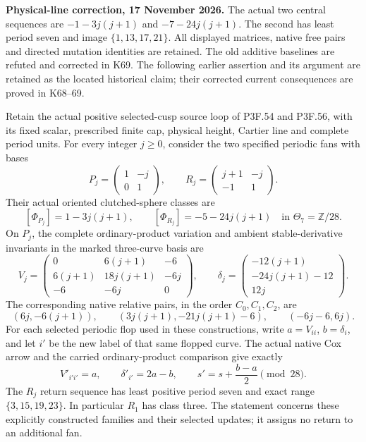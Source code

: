 \begin{theorem}\label{night:P3K.59}
\par\noindent\textbf{Physical-line correction, 17 November 2026.} The actual two central sequences are \(-1-3j(j+1)\) and \(-7-24j(j+1)\). The second has least period seven and image \(\{1,13,17,21\}\). All displayed matrices, native free pairs and directed mutation identities are retained. The old additive baselines are refuted and corrected in K69. The following earlier assertion and its argument are retained as the located historical claim; their corrected current consequences are proved in K68--69.\medskip\par 
Retain the actual positive selected-cusp source loop of
P3F.54 and P3F.56, with its fixed scalar, prescribed finite cap,
physical height, Cartier line and complete period units. For every
integer \(j\geq0\), consider the two specified periodic fans with bases
\[
 P_j=\begin{pmatrix}1&-j\\0&1\end{pmatrix},\qquad
 R_j=\begin{pmatrix}j+1&-j\\-1&1\end{pmatrix}.
\]
Their actual oriented clutched-sphere classes are
\[
 [\Phi_{P_j}]=1-3j(j+1),\qquad
 [\Phi_{R_j}]=-5-24j(j+1)\quad\text{in }\Theta_7=\mathbb Z/28.
\]
On \(P_j\), the complete ordinary-product variation and ambient
stable-derivative invariants in the marked three-curve basis are
\[
 V_j=\begin{pmatrix}
 0&6(j+1)&-6\\
 6(j+1)&18j(j+1)&-6j\\
 -6&-6j&0
 \end{pmatrix},\qquad
 \delta_j=\begin{pmatrix}-12(j+1)\\-24j(j+1)-12\\12j\end{pmatrix}.
\]
The corresponding native relative pairs, in the order \(C_0,C_1,C_2\), are
\[
 (6j,-6(j+1)),\qquad
 (3j(j+1),-21j(j+1)-6),\qquad
 (-6j-6,6j).
\]
For each selected periodic flop used in these constructions, write
\(a=V_{ii}\), \(b=\delta_i\), and let \(i'\) be the new label of that
same flopped curve. The actual native Cox arrow and the carried
ordinary-product comparison give exactly
\[
 V'_{i'i'}=a,\qquad \delta'_{i'}=2a-b,\qquad
 s'=s+\frac{b-a}{2}\pmod {28}.
\]
The \(R_j\) return sequence has least positive period seven and exact
range \(\{3,15,19,23\}\). In particular \(R_1\) has class three.
The statement concerns these explicitly constructed families and their
selected updates; it assigns no return to an additional fan.
\end{theorem}
